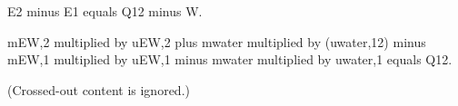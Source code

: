 E2 minus E1 equals Q12 minus W.  

mEW,2 multiplied by uEW,2 plus mwater multiplied by (uwater,12) minus mEW,1 multiplied by uEW,1 minus mwater multiplied by uwater,1 equals Q12.  

(Crossed-out content is ignored.)